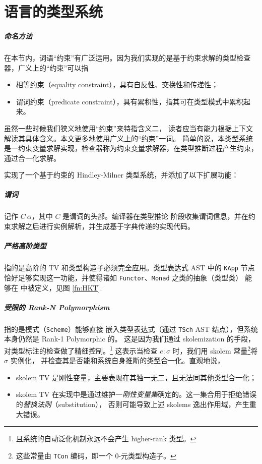 \chapter{\Tigris 语言的类型系统}

\paragraph{命名方法} 在本节内，词语“约束”有广泛运用。因为我们实现的是基于约束求解的类型检查器，广义上的“约束”可以指
\vspace{-1em}
\begin{itemize}\itemsep-.8em
  \item 相等约束（equality constraint），具有自反性、交换性和传递性；
  \item 谓词约束（predicate constraint），具有累积性，指其可在类型模式中累积起来。
\end{itemize}
\vspace{-1em}
虽然一些时候我们狭义地使用“约束”来特指含义二，
读者应当有能力根据上下文解读其具体含义。本文更多地使用广义上的“约束”一词。
简单的说，本类型系统是一约束变量求解实现，检查器称为约束变量求解器，在类型推断过程产生约束，
通过合一化求解。

\Tigris 实现了一个基于约束的 Hindley-Milner 类型系统，并添加了以下扩展功能：
{\setlength{\parskip}{-1em}
  \paragraph{谓词} 记作 \(C\ \bar{\alpha}\)，其中 $C$ 是谓词的头部。编译器在类型推论
  阶段收集谓词信息，并在约束求解之后进行实例解析，并生成基于字典传递的实现代码。
  \paragraph{严格高阶类型} 指的是高阶的 TV 和类型构造子必须完全应用。类型表达式 AST 中的
  \texttt{KApp} 节点恰好足够实现这一功能，并使得诸如 \texttt{Functor}、\texttt{Monad} 之类的抽象（类型类）
  能够在 \Tigris 中被定义，见图 \ref{fn:HKT}.
  \paragraph{受限的 Rank-N Polymorphism} 指的是模式（\texttt{Scheme}）能够直接
  嵌入类型表达式（通过 \texttt{TSch} AST 结点），但系统本身仍然是 Rank-1 Polymorphic 的。
  这是因为我们通过 skolemization 的手段，对类型标注的检查做了精细控制。\footnote{
    且系统的自动泛化机制永远不会产生 higher-rank 类型。
  }
  这表示当检查 \(e : \sigma\) 时，我们用 skolem 常量\footnote{
    这些常量由 \texttt{TCon} 编码，即一个 0-元类型构造子。
  }将 \(\sigma\) 实例化，
  并检查其是否能和系统自身推断的类型合一化。直观地说，
}
\begin{itemize}\itemsep-.5em
  \item skolem TV 是刚性变量，主要表现在其独一无二，且无法同其他类型合一化；
  \item skolem TV 在实现中是通过维护一\emph{刚性变量集}确定的。这一集合用于拒绝错误的\emph{替换法则}（substitution），
    否则可能导致上述 skolems 逸出作用域，产生重大错误。
\end{itemize}
